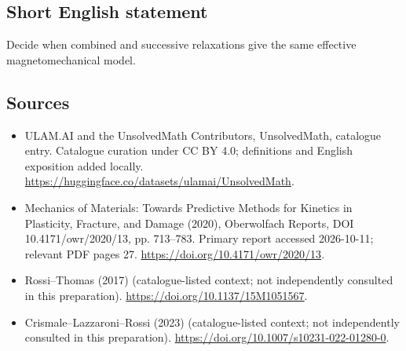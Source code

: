 \documentclass[11pt]{article}
\begin{document}
\subsection{Short English statement}
Decide when combined and successive relaxations give the same effective magnetomechanical model.
\subsection{Sources}
\begin{itemize}
\item[\hypertarget{source:statement:1}{S1}] ULAM.AI and the UnsolvedMath Contributors, UnsolvedMath, catalogue entry. Catalogue curation under CC BY 4.0; definitions and English exposition added locally.
\url{https://huggingface.co/datasets/ulamai/UnsolvedMath}.
\item[\hypertarget{source:statement:2}{S2}] Mechanics of Materials: Towards Predictive Methods for Kinetics in Plasticity, Fracture, and Damage (2020), Oberwolfach Reports, DOI 10.4171/owr/2020/13, pp. 713--783. Primary report accessed 2026-10-11; relevant PDF pages 27.
\url{https://doi.org/10.4171/owr/2020/13}.
\item[\hypertarget{source:statement:3}{S3}] Rossi--Thomas (2017) (catalogue-listed context; not independently consulted in this preparation).
\url{https://doi.org/10.1137/15M1051567}.
\item[\hypertarget{source:statement:4}{S4}] Crismale--Lazzaroni--Rossi (2023) (catalogue-listed context; not independently consulted in this preparation).
\url{https://doi.org/10.1007/s10231-022-01280-0}.
\end{itemize}
\label{end:statement}
\end{document}
